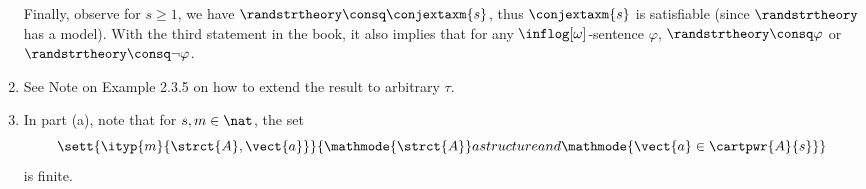 \begin{enumerate}[1.]
Finally, observe for $s \geq 1$, we have $\randstrtheory \consq \conjextaxm{s}$, thus $\conjextaxm{s}$ is satisfiable (since $\randstrtheory$ has a model). With the third statement in the book, it also implies that for any $\inflog[\omega]$-sentence $\varphi$, $\randstrtheory \consq \varphi$ or $\randstrtheory \consq \neg\varphi$.
%
\item {} See Note on Example 2.3.5 on how to extend the result to arbitrary $\tau$.
%
\item {} In part (a), note that for $s, m \in \nat$, the set
\[
\sett{\ityp{m}{\strct{A}, \vect{a}}}{\mathmode{\strct{A}} a structure and \mathmode{\vect{a} \in \cartpwr{A}{s}}}
\]
is finite.
%
\end{enumerate}
